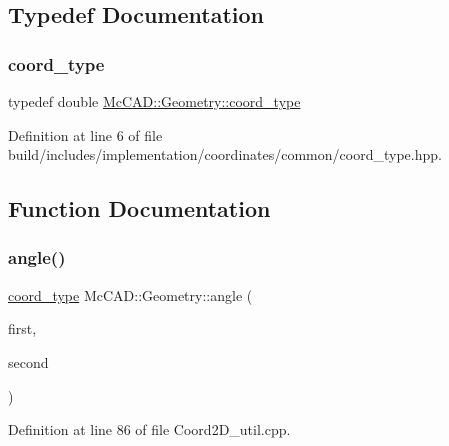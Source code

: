 \subsection{Typedef Documentation}
\mbox{\label{namespaceMcCAD_1_1Geometry_ac043b37a4a7e849fca22869e1982d2f8}} 
\subsubsection{\texorpdfstring{coord\+\_\+type}{coord\_type}}
{\footnotesize\ttfamily typedef double \hyperlink{namespaceMcCAD_1_1Geometry_ac043b37a4a7e849fca22869e1982d2f8}{Mc\+C\+A\+D\+::\+Geometry\+::coord\+\_\+type}}



Definition at line 6 of file build/includes/implementation/coordinates/common/coord\+\_\+type.\+hpp.



\subsection{Function Documentation}
\mbox{\label{namespaceMcCAD_1_1Geometry_aa7ab15668cf6f88ba392926c3039d5e5}} 
\subsubsection{\texorpdfstring{angle()}{angle()}\hspace{0.1cm}{\footnotesize\ttfamily [1/2]}}
{\footnotesize\ttfamily \hyperlink{namespaceMcCAD_1_1Geometry_ac043b37a4a7e849fca22869e1982d2f8}{coord\+\_\+type} Mc\+C\+A\+D\+::\+Geometry\+::angle (\begin{DoxyParamCaption}\item[{const \hyperlink{classMcCAD_1_1Geometry_1_1Coord2D}{Coord2D} \&}]{first,  }\item[{const \hyperlink{classMcCAD_1_1Geometry_1_1Coord2D}{Coord2D} \&}]{second }\end{DoxyParamCaption})}



Definition at line 86 of file Coord2\+D\+\_\+util.\+cpp.


